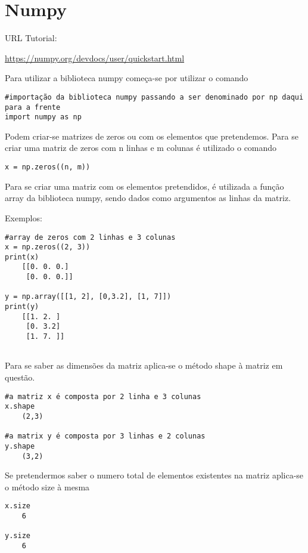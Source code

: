 \documentclass{article}
\begin{document}
\section{Numpy}

URL Tutorial:

\url{https://numpy.org/devdocs/user/quickstart.html}

Para utilizar a biblioteca numpy começa-se por utilizar o comando

\begin{lstlisting}
#importação da biblioteca numpy passando a ser denominado por np daqui para a frente
import numpy as np
\end{lstlisting}

Podem criar-se matrizes de zeros ou com os elementos que pretendemos. Para se criar uma matriz de zeros com n linhas e m colunas \'e utilizado o comando 

\begin{lstlisting}
x = np.zeros((n, m))
\end{lstlisting}

Para se criar uma matriz com os elementos pretendidos, \'e utilizada a fun\c c\~ao array da biblioteca numpy, sendo dados como argumentos as linhas da matriz.

Exemplos:

\begin{lstlisting}
#array de zeros com 2 linhas e 3 colunas
x = np.zeros((2, 3))
print(x)
	[[0. 0. 0.]
	 [0. 0. 0.]]

y = np.array([[1, 2], [0,3.2], [1, 7]])
print(y)
	[[1. 2. ]
	 [0. 3.2]
	 [1. 7. ]]
	 
\end{lstlisting}

Para se saber as dimens\~oes da matriz aplica-se o m\'etodo shape \`a matriz em quest\~ao.

\begin{lstlisting}
#a matriz x é composta por 2 linha e 3 colunas
x.shape
	(2,3)

#a matrix y é composta por 3 linhas e 2 colunas	
y.shape
	(3,2)
\end{lstlisting}

Se pretendermos saber o numero total de elementos existentes na matriz aplica-se o m\'etodo size \`a mesma

\begin{lstlisting}
x.size
	6

y.size
	6
\end{lstlisting}
\end{document}
